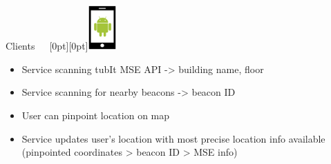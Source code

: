 \documentclass[11pt]{beamer}
\begin{document}
\begin{frame}{Clients~~~\raisebox{-10pt}[0pt][0pt]{\includegraphics[width=0.08\textwidth]{tech-stack-android}}}

  \begin{itemize}
    \item Service scanning tubIt MSE API -> building name, floor
    \item Service scanning for nearby beacons -> beacon ID
    \item User can pinpoint location on map
    \item Service updates user's location with most precise location info available \\(pinpointed coordinates > beacon ID > MSE info)
  \end{itemize}

\end{frame}
\end{document}
